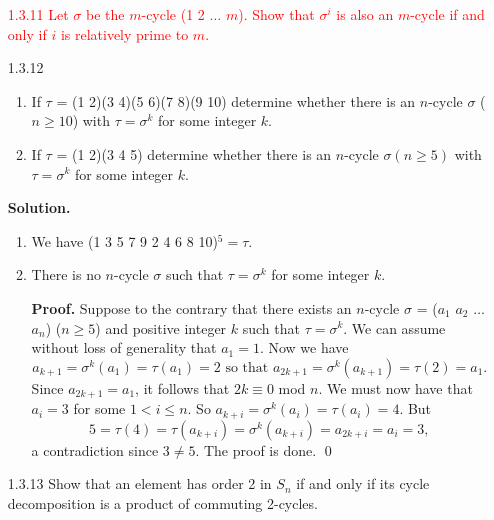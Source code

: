 \begin{enumerate}
      That is \eqref{1_3_10_1} holds for $j + 1$. It follows by Mathematical
      Induction that it holds for all positive $n$. Now we have that
      $\sigma^m(a_k) = a_{k + m} = a_k$, so that $\sigma^m = 1$ and thus
      $|\sigma| \le m$. Consider $1 \le s < m$. We have
      $\sigma^s(a_m) = a_{m + s} = a_s \neq a_m$ since $1 \le s < m$. Thus
      $\sigma^s \neq 1$. We can then conclude that $|\sigma| = m$. \qed
   \item[\textcolor{red}{1.3.11}] \textcolor{red}{Let $\sigma$ be the $m$-cycle 
                                 (1 2 $\ldots$ $m$). Show that $\sigma^i$ is 
                                 also an $m$-cycle if and only if $i$ is
                                 relatively prime to $m$.}
   \item[1.3.12]  \begin{enumerate}
                     \item If $\tau$ = (1 2)(3 4)(5 6)(7 8)(9 10) determine
                           whether there is an $n$-cycle $\sigma$ ($n \ge 10$)
                           with $\tau = \sigma^k$ for some integer $k$.
                     \item If $\tau$ = (1 2)(3 4 5) determine whether there is
                           an $n$-cycle $\sigma (n \ge 5)$ with
                           $\tau = \sigma^k$ for some integer $k$.
                  \end{enumerate}

      \textbf{Solution.}

      \begin{enumerate}
         \item We have (1 3 5 7 9 2 4 6 8 10)$^5 = \tau$.
         \item There is no $n$-cycle $\sigma$ such that $\tau = \sigma^k$ for
               some integer $k$.

               \textbf{Proof.} Suppose to the contrary that there exists an
               $n$-cycle $\sigma$ = ($a_1$ $a_2$ $\ldots$ $a_n$) ($n \ge 5$) and
               positive integer $k$ such that $\tau = \sigma^k$. We can assume
               without loss of generality that $a_1 = 1$. Now we have
               $$a_{k+1} = \sigma^k(a_1) = \tau(a_1) = 2 \text{ so that }
                 a_{2k+1} = \sigma^k(a_{k+1}) = \tau(2) = a_1.$$
               Since $a_{2k+1} = a_1$, it follows that $2k \equiv 0$ mod $n$.
               We must now have that $a_i = 3$ for some $1 < i \le n$. So
               $a_{k+i} = \sigma^k(a_i) = \tau(a_i) = 4$. But
               $$5 = \tau(4) = \tau(a_{k+i}) = \sigma^k(a_{k+i}) = a_{2k+i} =
                 a_i = 3,$$
               a contradiction since $3 \neq 5$. The proof is done. \qed
      \end{enumerate}
   \item[1.3.13]  Show that an element has order 2 in $S_n$ if and only if its
                  cycle decomposition is a product of commuting 2-cycles.


\end{enumerate}
